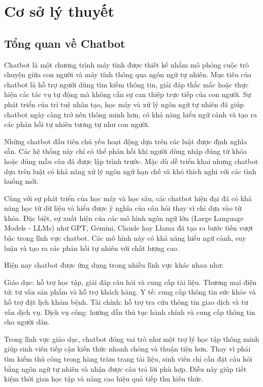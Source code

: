 \documentclass[12pt,a4paper]{report}
\begin{document}
	
	\chapter{Cơ sở lý thuyết}
	
	\section{Tổng quan về Chatbot}
	
Chatbot là một chương trình máy tính được thiết kế nhằm mô phỏng cuộc trò chuyện giữa con người và máy tính thông qua ngôn ngữ tự nhiên. Mục tiêu của chatbot là hỗ trợ người dùng tìm kiếm thông tin, giải đáp thắc mắc hoặc thực hiện các tác vụ tự động mà không cần sự can thiệp trực tiếp của con người. Sự phát triển của trí tuệ nhân tạo, học máy và xử lý ngôn ngữ tự nhiên đã giúp chatbot ngày càng trở nên thông minh hơn, có khả năng hiểu ngữ cảnh và tạo ra các phản hồi tự nhiên tương tự như con người.

Những chatbot đầu tiên chủ yếu hoạt động dựa trên các luật được định nghĩa sẵn. Các hệ thống này chỉ có thể phản hồi khi người dùng nhập đúng từ khóa hoặc đúng mẫu câu đã được lập trình trước. Mặc dù dễ triển khai nhưng chatbot dựa trên luật có khả năng xử lý ngôn ngữ hạn chế và khó thích nghi với các tình huống mới.

Cùng với sự phát triển của học máy và học sâu, các chatbot hiện đại đã có khả năng học từ dữ liệu và hiểu được ý nghĩa của câu hỏi thay vì chỉ dựa vào từ khóa. Đặc biệt, sự xuất hiện của các mô hình ngôn ngữ lớn (Large Language Models - LLMs) như GPT, Gemini, Claude hay Llama đã tạo ra bước tiến vượt bậc trong lĩnh vực chatbot. Các mô hình này có khả năng hiểu ngữ cảnh, suy luận và tạo ra các phản hồi tự nhiên với chất lượng cao.

Hiện nay chatbot được ứng dụng trong nhiều lĩnh vực khác nhau như:

Giáo dục: hỗ trợ học tập, giải đáp câu hỏi và cung cấp tài liệu.
Thương mại điện tử: tư vấn sản phẩm và hỗ trợ khách hàng.
Y tế: cung cấp thông tin sức khỏe và hỗ trợ đặt lịch khám bệnh.
Tài chính: hỗ trợ tra cứu thông tin giao dịch và tư vấn dịch vụ.
Dịch vụ công: hướng dẫn thủ tục hành chính và cung cấp thông tin cho người dân.

Trong lĩnh vực giáo dục, chatbot đóng vai trò như một trợ lý học tập thông minh giúp sinh viên tiếp cận kiến thức nhanh chóng và thuận tiện hơn. Thay vì phải tìm kiếm thủ công trong hàng trăm trang tài liệu, sinh viên chỉ cần đặt câu hỏi bằng ngôn ngữ tự nhiên và nhận được câu trả lời phù hợp. Điều này giúp tiết kiệm thời gian học tập và nâng cao hiệu quả tiếp thu kiến thức.
\end{document}
